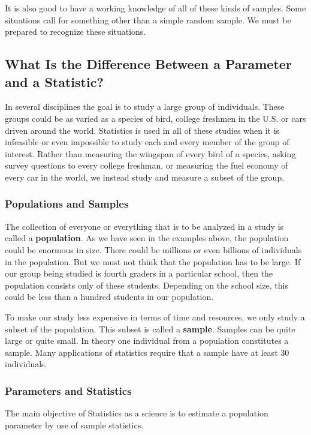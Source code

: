 It is also good to have a working knowledge of all of these kinds of samples. Some situations call for something other than a simple random sample. We must be prepared to recognize these situations.


\subsection*{What Is the Difference Between a Parameter and a Statistic?}

In several disciplines the goal is to study a large group of individuals. These groups could be as varied as a species of bird, college freshmen in the U.S. or cars driven around the world. Statistics is used in all of these studies when it is infeasible or even impossible to study each and every member of the group of interest. Rather than measuring the wingspan of every bird of a species, asking survey questions to every college freshman, or measuring the fuel economy of every car in the world, we instead study and measure a subset of the group.

\subsubsection*{Populations and Samples}

The collection of everyone or everything that is to be analyzed in a study is called a \textbf{population}. As we have seen in the examples above, the population could be enormous in size. There could be millions or even billions of individuals in the population. But we must not think that the population has to be large. If our group being studied is fourth graders in a particular school, then the population consists only of these students. Depending on the school size, this could be less than a hundred students in our population.

To make our study less expensive in terms of time and resources, we only study a subset of the population. This subset is called a \textbf{sample}. Samples can be quite large or quite small. In theory one individual from a population constitutes a sample. Many applications of statistics require that a sample have at least 30 individuals.

\subsubsection*{Parameters and Statistics}

The main objective of Statistics as a science is to estimate a population parameter by use of sample statistics.

